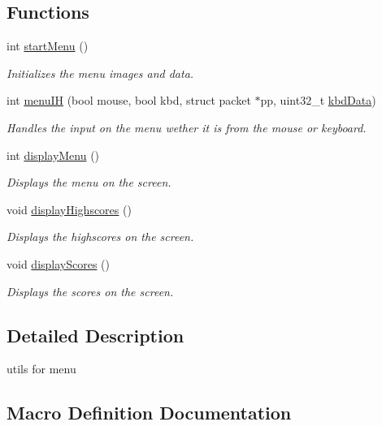 \subsection*{Functions}
\begin{DoxyCompactItemize}
\item 
int \mbox{\hyperlink{group__menu_ga3bd019c071fe96105524873879e16c06}{start\+Menu}} ()
\begin{DoxyCompactList}\small\item\em Initializes the menu images and data. \end{DoxyCompactList}\item 
int \mbox{\hyperlink{group__menu_ga1c459dc7e822e8e658b11c66508d79f1}{menu\+IH}} (bool mouse, bool kbd, struct packet $\ast$pp, uint32\+\_\+t \mbox{\hyperlink{keyboard_8c_a6486f62fb206e8e9ca3ace0ba1e6efbf}{kbd\+Data}})
\begin{DoxyCompactList}\small\item\em Handles the input on the menu wether it is from the mouse or keyboard. \end{DoxyCompactList}\item 
int \mbox{\hyperlink{group__menu_gaad9ed7a055a99883645739e4bfca0e5e}{display\+Menu}} ()
\begin{DoxyCompactList}\small\item\em Displays the menu on the screen. \end{DoxyCompactList}\item 
void \mbox{\hyperlink{group__menu_ga69fa28cb0fa5f4165feb0612cd3ba98e}{display\+Highscores}} ()
\begin{DoxyCompactList}\small\item\em Displays the highscores on the screen. \end{DoxyCompactList}\item 
void \mbox{\hyperlink{group__menu_ga4e67dd36352ce9409d1994cad2553089}{display\+Scores}} ()
\begin{DoxyCompactList}\small\item\em Displays the scores on the screen. \end{DoxyCompactList}\end{DoxyCompactItemize}


\subsection{Detailed Description}
utils for menu 

\subsection{Macro Definition Documentation}
\mbox{\label{group__menu_ga5c2fee47b6e9a8dc63fee2efa67e6cdd}} 

